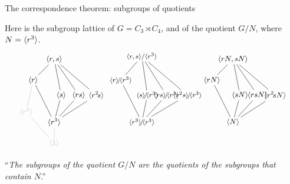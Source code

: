 \documentclass[8pt]{beamer}
\begin{document}

\begin{frame}{The correspondence theorem: subgroups of quotients} \smallskip
  
  Here is the subgroup lattice of $G=C_3 \rtimes C_4$, and of the quotient
  $G/N$, where $N=\langle r^3\rangle$.
  \[
  \begin{tikzpicture}[scale=.6,auto]
    \begin{scope}[shift={(0,-0)},shorten >= -2pt, shorten <= -2pt]
      \tikzstyle{every node}=[font=\small]
      \node(G) at (0,6) {$\<r,s\>$};
      \node(b) at (-1.5,4.5) {$\<r\>$};
      \node(aa) at (0,1.5) {$\<r^3\>$};
      \node(bb) at (-2,2.25) {\color{faded}$\<r^2\>$};
      \node(a) at (.5,24/7) {$\<s\>$};
      \node(ab) at (1.75,24/7) { $\<rs\>$};
      \node(ba) at (3,24/7) {$\<r^2\!s\>$};
      \node(1) at (0,0) {\color{faded}$\<1\>$};
      \draw[faded](1)--(aa); \draw[faded](1)--(bb);
      \draw(b)--(aa); \draw[faded](b)--(bb);
      \draw(G)--(a); \draw(G)--(ab); \draw(G)--(ba); \draw(G)--(b);
      \draw(aa)--(a); \draw(aa)--(ab); \draw(aa)--(ba);
    \end{scope}
    \begin{scope}[shift={(12.75,-0)},shorten >= -2pt, shorten <= -2pt]
      \tikzstyle{every node}=[font=\small]
      \node(G) at (0,6) {$\<rN,sN\>$};
      \node(b) at (-1.5,4.5) {$\<rN\>$};
      \node(aa) at (0,1.5) {$\<N\>$};
      \node(a) at (.5,24/7) {$\<sN\>$};
      \node(ab) at (1.75,24/7) { $\<rsN\>$};
      \node(ba) at (3,24/7) {$\<r^2\!sN\>$};
      \draw(b)--(aa);
      \draw(G)--(a); \draw(G)--(ab); \draw(G)--(ba); \draw(G)--(b);
      \draw(aa)--(a); \draw(aa)--(ab); \draw(aa)--(ba);
    \end{scope}
    \begin{scope}[shift={(6.25,-0)},shorten >= -2pt, shorten <= -2pt]
      \tikzstyle{every node}=[font=\footnotesize]
      \node(G) at (0,6.2) {$\<r,s\>/\<r^3\>$};
      \node(b) at (-1.5,4.5) {$\<r\>\!/\!\<r^3\>$};
      \node(aa) at (0,1.5) {$\<r^3\>\!/\!\<r^3\>$};
      \node(a) at (.4,24/7) {$\<s\>\!/\!\<r^3\>$};
      \node(ab) at (1.75,24/7) { $\<rs\>\!/\!\<r^3\>$};
      \node(ba) at (3.25,24/7) {$\<r^2s\>\!/\!\<r^3\>$};
      \draw(b)--(aa); 
      \draw(G)--(a); \draw(G)--(ab); \draw(G)--(ba); \draw(G)--(b);
      \draw(aa)--(a); \draw(aa)--(ab); \draw(aa)--(ba);
    \end{scope}
  \end{tikzpicture}
  \]
  ``\emph{The subgroups of the
    quotient $G/N$ are the quotients of the subgroups that contain $N$}.''
    

\end{frame}
\end{document}
